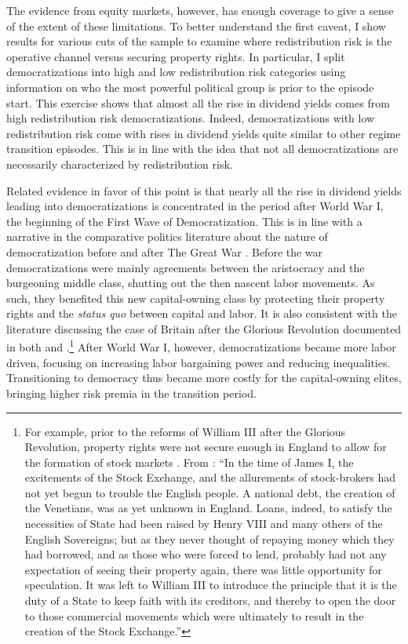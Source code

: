 \documentclass[12pt]{article}
\numberwithin{equation}{section}
\begin{document}
\label{par:low_redist_evidence1}
The evidence from equity markets, however, has enough coverage to give a sense of the extent of these limitations. To better understand the first caveat, I show results for various cuts of the sample to examine where redistribution risk is the operative channel versus securing property rights. In particular, I split democratizations into high and low redistribution risk categories using information on who the most powerful political group is prior to the episode start. This exercise shows that almost all the rise in dividend yields comes from high redistribution risk democratizations.  Indeed, democratizations with low redistribution risk come with rises in dividend yields quite similar to other regime transition episodes. This is in line with the idea that not all democratizations are necessarily characterized by redistribution risk.

\label{par:low_redist_evidence2}
Related evidence in favor of this point is that nearly all the rise in dividend yields leading into democratizations is concentrated in the period after World War I, the beginning of the First Wave of Democratization.  This is in line with a narrative in the comparative politics literature about the nature of democratization before and after The Great War \citep{Luebbert1991}. Before the war democratizations were mainly agreements between the aristocracy and the burgeoning middle class, shutting out the then nascent labor movements. As such, they benefited this new capital-owning class by protecting their property rights and the \textit{status quo} between capital and labor. It is also consistent with the literature discussing the case of Britain after the Glorious Revolution documented in both \cite{North1989} and \cite{Acemoglu2006}.\footnote{For example, prior to the reforms of William III after the Glorious Revolution, property rights were not secure enough in England to allow for the formation of stock markets \citep{Brodhurst1897}. From \cite{Brodhurst1897}: ``In the time of James I, the excitements of the Stock Exchange, and the allurements of stock-brokers had not yet begun to trouble the English people. A national debt, the creation of the Venetians, was as yet unknown in England. Loans, indeed, to satisfy the necessities of State had been raised by Henry VIII and many others of the English Sovereigns; but as they never thought of repaying money which they had borrowed, and as those who were forced to lend, probably had not any expectation of seeing their property again, there was little opportunity for speculation. It was left to William III to introduce the principle that it is the duty of a State to keep faith with its creditors, and thereby to open the door to those commercial movements which were ultimately to result in the creation of the Stock Exchange.''} After World War I, however, democratizations became more labor driven, focusing on increasing labor bargaining power and reducing inequalities. Transitioning to democracy thus became more costly for the capital-owning elites, bringing higher risk premia in the transition period.
\end{document}
